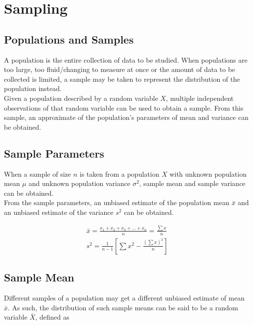\documentclass[../main]{subfiles}
\begin{document}
\section{Sampling}

	\subsection{Populations and Samples}

	A population is the entire collection of data to be studied. When populations are too large, too fluid/changing to measure at once or the amount of data to be collected is limited, a sample may be taken to represent the distribution of the population instead. \\

	Given a population described by a random variable \(X\), multiple independent observations of that random variable can be used to obtain a sample. From this sample, an approximate of the population's parameters of mean and variance can be obtained. \\

	\subsection{Sample Parameters}

	When a sample of size \(n\) is taken from a population \(X\) with unknown population mean \(\mu\) and unknown population variance \(\sigma^2\), sample mean and sample variance can be obtained. \\

	From the sample parameters, an unbiased estimate of the population mean \(\bar{x}\) and an unbiased estimate of the variance \(s^2\) can be obtained.

	\begin{equation*} \begin{gathered}
		\bar{x} = \frac{x_1 + x_2 + x_3 + \dots + x_n}{n} = \frac{\sum x}{n} \\
		s^2 = \frac{1}{n-1} \left[ \sum x^2 - \frac{(\sum x)^2}{n} \right]
	\end{gathered} \end{equation*}

	\subsection{Sample Mean}

	Different samples of a population may get a different unbiased estimate of mean \(\bar{x}\). As such, the distribution of such sample means can be said to be a random variable \(\bar{X}\), defined as
\end{document}
